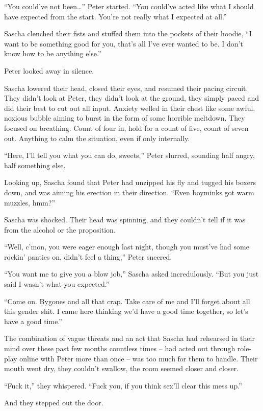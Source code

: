 ``You could've not been\ldots{}'' Peter started. ``You could've acted like what I should have expected from the start. You're not really what I expected at all.''

Sascha clenched their fists and stuffed them into the pockets of their hoodie, ``I want to be something good for you, that's all I've ever wanted to be. I don't know how to be anything else.''

Peter looked away in silence.

Sascha lowered their head, closed their eyes, and resumed their pacing circuit. They didn't look at Peter, they didn't look at the ground, they simply paced and did their best to cut out all input. Anxiety welled in their chest like some awful, noxious bubble aiming to burst in the form of some horrible meltdown. They focused on breathing. Count of four in, hold for a count of five, count of seven out. Anything to calm the situation, even if only internally.

``Here, I'll tell you what you can do, sweets,'' Peter slurred, sounding half angry, half something else.

Looking up, Sascha found that Peter had unzipped his fly and tugged his boxers down, and was aiming his erection in their direction. ``Even boyminks got warm muzzles, hmm?''

Sascha was shocked. Their head was spinning, and they couldn't tell if it was from the alcohol or the proposition.

``Well, c'mon, you were eager enough last night, though you must've had some rockin' panties on, didn't feel a thing,'' Peter sneered.

``You want me to give you a blow job,'' Sascha asked incredulously. ``But you just said I wasn't what you expected.''

``Come on. Bygones and all that crap. Take care of me and I'll forget about all this gender shit. I came here thinking we'd have a good time together, so let's have a good time.''

The combination of vague threats and an act that Sascha had rehearsed in their mind over these past few months countless times -- had acted out through role-play online with Peter more than once -- was too much for them to handle. Their mouth went dry, they couldn't swallow, the room seemed closer and closer.

``Fuck it,'' they whispered. ``Fuck you, if you think sex'll clear this mess up.''

And they stepped out the door.

